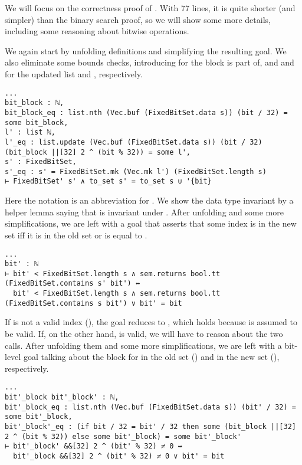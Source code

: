 We will focus on the correctness proof of . With 77 lines, it is
quite shorter (and simpler) than the binary search proof, so we will show some
more details, including some reasoning about bitwise operations.

We again start by unfolding definitions and simplifying the resulting goal. We
also eliminate some bounds checks, introducing  for the  block
 is part of, and  and  for the updated list and
, respectively.

\begin{verbatim}
...
bit_block : ℕ,
bit_block_eq : list.nth (Vec.buf (FixedBitSet.data s)) (bit / 32) = some bit_block,
l' : list ℕ,
l'_eq : list.update (Vec.buf (FixedBitSet.data s)) (bit / 32) (bit_block ||[32] 2 ^ (bit % 32)) = some l',
s' : FixedBitSet,
s'_eq : s' = FixedBitSet.mk (Vec.mk l') (FixedBitSet.length s)
⊢ FixedBitSet' s' ∧ to_set s' = to_set s ∪ '{bit}
\end{verbatim}

Here the notation \lean{||[32]} is an abbreviation for . We show the data type invariant by a helper lemma saying that
 is invariant under . After unfolding
 and some more simplifications, we are left with a
goal that asserts that some index  is in the new set iff it is in
the old set or is equal to .

\begin{verbatim}
...
bit' : ℕ
⊢ bit' < FixedBitSet.length s ∧ sem.returns bool.tt (FixedBitSet.contains s' bit') ↔
  bit' < FixedBitSet.length s ∧ sem.returns bool.tt (FixedBitSet.contains s bit') ∨ bit' = bit
\end{verbatim}

If  is not a valid index (), the
goal reduces to , which holds because  is assumed to
be valid. If, on the other hand,  is valid, we will have to reason
about the two  calls. After unfolding them and some more
simplifications, we are left with a bit-level goal talking about the
 block for  in the old set () and in the
new set (), respectively.

\begin{verbatim}
...
bit'_block bit'_block' : ℕ,
bit'_block_eq : list.nth (Vec.buf (FixedBitSet.data s)) (bit' / 32) = some bit'_block,
bit'_block'_eq : (if bit / 32 = bit' / 32 then some (bit_block ||[32] 2 ^ (bit % 32)) else some bit'_block) = some bit'_block'
⊢ bit'_block' &&[32] 2 ^ (bit' % 32) ≠ 0 ↔
  bit'_block &&[32] 2 ^ (bit' % 32) ≠ 0 ∨ bit' = bit
\end{verbatim}

